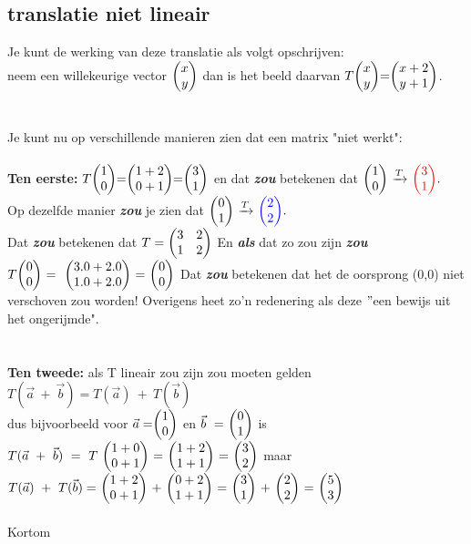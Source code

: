 \subsection{translatie niet lineair}
Je kunt de werking van deze translatie als volgt opschrijven:\\ neem een willekeurige vector $ \vectwee{x}{y} $ dan is het beeld daarvan $ T \vectwee{x}{y} = \vectwee{x+2}{y+1} $.\\ \\ \\
Je kunt nu op verschillende manieren zien dat een matrix "niet werkt":\\ \\
\textbf{ Ten eerste:} $ T \vectwee{1}{0} = \vectwee{1+2}{0+1} = \vectwee{3}{1} $ en dat \textit{\textbf{zou}} betekenen dat 
$ \vectwee{1}{0}  \  \xrightarrow{T}   \   \vectwee[red]{ 3 } {1}. $ \\ Op dezelfde manier \textit{\textbf{zou}} je zien dat  
$ \vectwee{0}{1}  \  \xrightarrow{T}   \   \vectwee[blue]{ 2 } {2}. $ \\ Dat \textbf{\textit{zou}} betekenen dat 
$ T = \begin{pmatrix}  3 & 2  \\  1 & 2  \end{pmatrix} $ En \textbf{\textit{als}} dat zo zou zijn \textbf{\textit{zou}} 
$  T \vectwee{0}{0} \ = \ 
\ \vectwee{ 3.0 + 2.0 }{ 1.0 + 2.0 } \ 
= \ \vectwee{0}{0} $ Dat \textbf{\textit{zou}} betekenen dat het de oorsprong (0,0) niet verschoven zou worden! Overigens heet zo'n redenering als deze  $"$een bewijs uit het ongerijmde".\\ \\ \\
\textbf{Ten tweede:} als T lineair zou zijn zou moeten gelden\\ 
$ T(\vec{a} \ + \ \vec{b} )  
=  T(\vec{a}) \ + \ T(\vec{b}) $ \\ dus bijvoorbeeld voor $ \vec{a} = \vectwee{1}{0} $ en   
$ \vec{b} \ = \ \vectwee{0}{1} $  is \\ 
$ T(\vec{a} \ + \ \vec{b} ) \ 
= \ T \ \vectwee{1+0}{0+1} \ 
= \  \vectwee{1+2}{1+1} \ 
= \ \vectwee{3}{2}  $ 
\quad maar \\
$ T(\vec{a}) \ + \ T(\vec{b}) 
= \  \vectwee{1+2}{0+1} \  + \  \vectwee{0+2}{1+1} \ 
= \  \vectwee{3}{1} \ + \  \vectwee{2}{2} \ 
= \  \vectwee{5}{3} \ 
$\\ \\
Kortom 

